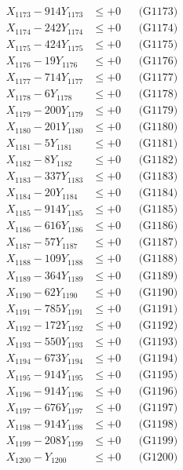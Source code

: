 \documentclass[a4paper,10pt]{article}
\begin{document}
{\begin{align}
X_{1173} - 914Y_{1173} &\leq +0 && \text{(G1173)} \\
X_{1174} - 242Y_{1174} &\leq +0 && \text{(G1174)} \\
X_{1175} - 424Y_{1175} &\leq +0 && \text{(G1175)} \\
X_{1176} - 19Y_{1176} &\leq +0 && \text{(G1176)} \\
X_{1177} - 714Y_{1177} &\leq +0 && \text{(G1177)} \\
X_{1178} - 6Y_{1178} &\leq +0 && \text{(G1178)} \\
X_{1179} - 200Y_{1179} &\leq +0 && \text{(G1179)} \\
X_{1180} - 201Y_{1180} &\leq +0 && \text{(G1180)} \\
\allowbreak
X_{1181} - 5Y_{1181} &\leq +0 && \text{(G1181)} \\
X_{1182} - 8Y_{1182} &\leq +0 && \text{(G1182)} \\
X_{1183} - 337Y_{1183} &\leq +0 && \text{(G1183)} \\
X_{1184} - 20Y_{1184} &\leq +0 && \text{(G1184)} \\
X_{1185} - 914Y_{1185} &\leq +0 && \text{(G1185)} \\
X_{1186} - 616Y_{1186} &\leq +0 && \text{(G1186)} \\
X_{1187} - 57Y_{1187} &\leq +0 && \text{(G1187)} \\
X_{1188} - 109Y_{1188} &\leq +0 && \text{(G1188)} \\
X_{1189} - 364Y_{1189} &\leq +0 && \text{(G1189)} \\
X_{1190} - 62Y_{1190} &\leq +0 && \text{(G1190)} \\
\allowbreak
X_{1191} - 785Y_{1191} &\leq +0 && \text{(G1191)} \\
X_{1192} - 172Y_{1192} &\leq +0 && \text{(G1192)} \\
X_{1193} - 550Y_{1193} &\leq +0 && \text{(G1193)} \\
X_{1194} - 673Y_{1194} &\leq +0 && \text{(G1194)} \\
X_{1195} - 914Y_{1195} &\leq +0 && \text{(G1195)} \\
X_{1196} - 914Y_{1196} &\leq +0 && \text{(G1196)} \\
X_{1197} - 676Y_{1197} &\leq +0 && \text{(G1197)} \\
X_{1198} - 914Y_{1198} &\leq +0 && \text{(G1198)} \\
X_{1199} - 208Y_{1199} &\leq +0 && \text{(G1199)} \\
X_{1200} - Y_{1200} &\leq +0 && \text{(G1200)} \\

\end{align}}
\end{document}
